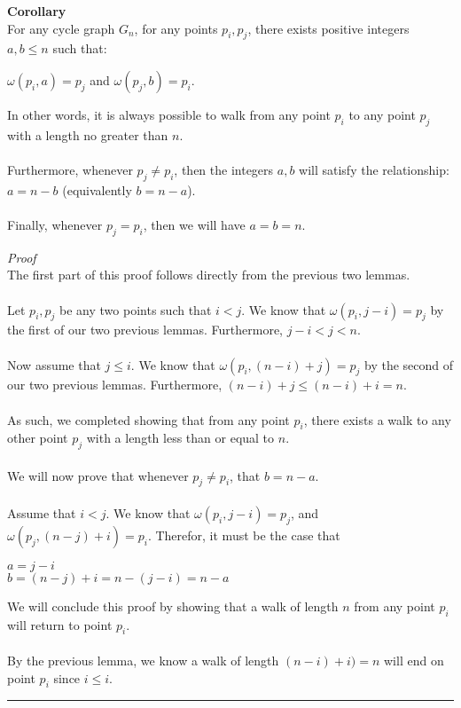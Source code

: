 \documentclass[a4paper,12pt]{article}
\begin{document}
\begin{tcolorbox}
\textbf{Corollary}\\
For any cycle graph $G_n$, for any points $p_i, p_j$, there exists positive integers $a, b \leq n$ such that:
\begin{center}
$\omega(p_i, a) = p_j$ and
$\omega(p_j, b) = p_i$.
\end{center}
In other words, it is always possible to walk from any point $p_i$ to any point $p_j$ with a length no greater than $n$.\\
\\
Furthermore, whenever $p_j \neq p_i$, then the integers $a, b$ will satisfy the relationship: $a = n - b$ (equivalently $b = n - a$).\\
\\
Finally, whenever $p_j = p_i$, then we will have $a = b = n$.
\end{tcolorbox}
\noindent
\textit{Proof}\\
The first part of this proof follows directly from the previous two lemmas.\\
\\
Let $p_i, p_j$ be any two points such that $i < j$. We know that $\omega(p_i, j - i) = p_j$ by the first of our two previous lemmas. Furthermore, $j - i < j < n$.\\
\\
Now assume that $j \leq i$. We know that $\omega(p_i, (n - i) + j) = p_j$ by the second of our two previous lemmas. Furthermore, $(n - i) + j \leq (n - i) + i = n$.\\
\\
As such, we completed showing that from any point $p_i$, there exists a walk to any other point $p_j$ with a length less than or equal to $n$.\\
\\
We will now prove that whenever $p_j \neq p_i$, that $b = n - a$.\\
\\
Assume that $i < j$. We know that $\omega(p_i, j - i) = p_j$, and $\omega(p_j, (n - j) + i) = p_i$. Therefor, it must be the case that
\begin{center}
$a = j - i$\\
$b = (n - j) + i = n - (j - i) = n - a$
\end{center}
We will conclude this proof by showing that a walk of length $n$ from any point $p_i$ will return to point $p_i$.\\
\\
By the previous lemma, we know a walk of length $(n - i) + i) = n$ will end on point $p_i$ since $i \leq i$.
\begin{center}
\noindent\rule{8cm}{0.4pt}
\end{center}
\end{document}
